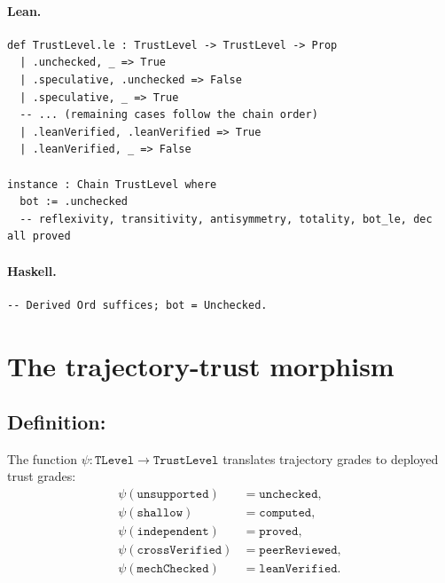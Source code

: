 \documentclass[11pt,a4paper]{article}
\begin{document}
\paragraph{Lean.}
\begin{lstlisting}[style=lean]
def TrustLevel.le : TrustLevel -> TrustLevel -> Prop
  | .unchecked, _ => True
  | .speculative, .unchecked => False
  | .speculative, _ => True
  -- ... (remaining cases follow the chain order)
  | .leanVerified, .leanVerified => True
  | .leanVerified, _ => False

instance : Chain TrustLevel where
  bot := .unchecked
  -- reflexivity, transitivity, antisymmetry, totality, bot_le, dec all proved
\end{lstlisting}

\paragraph{Haskell.}
\begin{lstlisting}[style=haskell]
-- Derived Ord suffices; bot = Unchecked.
\end{lstlisting}

\section{The trajectory-trust morphism}

\subsection{Definition: }

\begin{defn}
The function $\psi : \mathtt{TLevel} \to \mathtt{TrustLevel}$ translates
trajectory grades to deployed trust grades:
\begin{align*}
  \psi(\mathtt{unsupported})  &= \mathtt{unchecked}, \\
  \psi(\mathtt{shallow})       &= \mathtt{computed}, \\
  \psi(\mathtt{independent})   &= \mathtt{proved}, \\
  \psi(\mathtt{crossVerified}) &= \mathtt{peerReviewed}, \\
  \psi(\mathtt{mechChecked})   &= \mathtt{leanVerified}.
\end{align*}
\end{defn}
\end{document}
